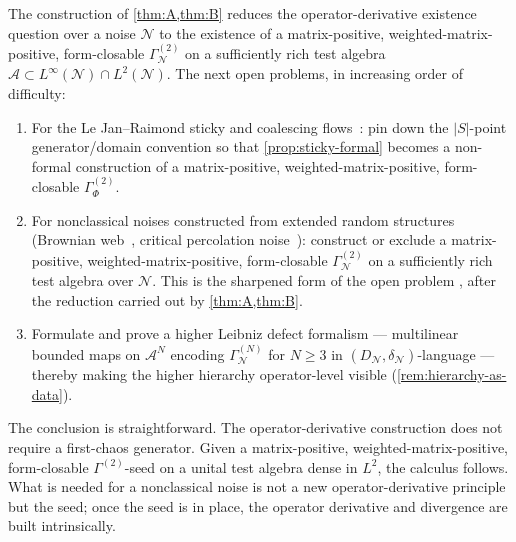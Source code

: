 \documentclass[11pt,reqno]{amsart}
\theoremstyle{plain}
\theoremstyle{definition}
\theoremstyle{remark}
\newcommand{\cA}{\mathcal A}
\newcommand{\cN}{\mathcal N}
\newcommand{\dN}{D_{\cN}}
\newcommand{\divN}{\delta_{\cN}}
\begin{document}
The construction of \cref{thm:A,thm:B} reduces the
operator-derivative existence question over a noise $\cN$ to
the existence of a matrix-positive, weighted-matrix-positive, form-closable
$\Gamma^{(2)}_{\cN}$ on a sufficiently rich test algebra
$\cA\subset L^{\infty}(\cN)\cap L^{2}(\cN)$. The next open
problems, in increasing order of difficulty:
\begin{enumerate}
\item[$(\mathrm O_{1})$] For the Le Jan--Raimond sticky and
coalescing flows~\cite{LeJanRaimond2004}: pin down the
$|S|$-point generator/domain convention so that
\cref{prop:sticky-formal} becomes a non-formal construction
of a matrix-positive, weighted-matrix-positive, form-closable $\Gamma^{(2)}_{\Phi}$.
\item[$(\mathrm O_{2})$] For nonclassical noises constructed
from extended random structures (Brownian web~\cite{SSS2017,Tsirelson2004},
critical percolation noise~\cite{SchrammSmirnov2011}):
construct or exclude a matrix-positive, weighted-matrix-positive, form-closable
$\Gamma^{(2)}_{\cN}$ on a sufficiently rich test algebra over
$\cN$. This is the sharpened form of the open problem
\cite[Prog.~7.1]{PrimitiveDivergence}, after the reduction
carried out by \cref{thm:A,thm:B}.
\item[$(\mathrm O_{3})$] Formulate and prove a higher Leibniz
defect formalism --- multilinear bounded maps on $\cA^{N}$
encoding $\Gamma^{(N)}_{\cN}$ for $N\ge 3$ in
$(\dN,\divN)$-language --- thereby making the higher hierarchy
operator-level visible
(\cref{rem:hierarchy-as-data}).
\end{enumerate}

The conclusion is straightforward. The operator-derivative
construction does not require a first-chaos generator. Given a
matrix-positive, weighted-matrix-positive, form-closable $\Gamma^{(2)}$-seed on a unital
test algebra dense in $L^{2}$, the calculus follows. What is
needed for a nonclassical noise is not a new
operator-derivative principle but the seed; once the seed is in
place, the operator derivative and divergence are built
intrinsically.
\end{document}
